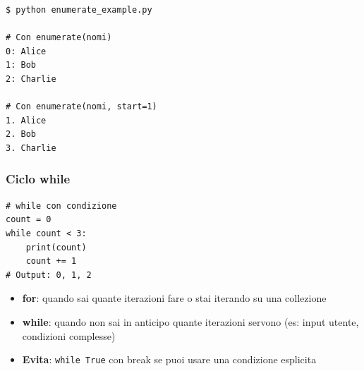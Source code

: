 \begin{tcolorbox}[title=Terminal Output - enumerate()]
\begin{verbatim}
$ python enumerate_example.py

# Con enumerate(nomi)
0: Alice
1: Bob
2: Charlie

# Con enumerate(nomi, start=1)
1. Alice
2. Bob
3. Charlie
\end{verbatim}
\end{tcolorbox}

\subsubsection{Ciclo while}
\label{subsubsec:cf-while}
\begin{lstlisting}
# while con condizione
count = 0
while count < 3:
    print(count)
    count += 1
# Output: 0, 1, 2
\end{lstlisting}
\begin{tcolorbox}[title=Quando usare while vs for]
\begin{itemize}
  \item \textbf{for}: quando sai quante iterazioni fare o stai iterando su una collezione
  \item \textbf{while}: quando non sai in anticipo quante iterazioni servono (es: input utente, condizioni complesse)
  \item \textbf{Evita}: \texttt{while True} con break se puoi usare una condizione esplicita
\end{itemize}
\end{tcolorbox}

